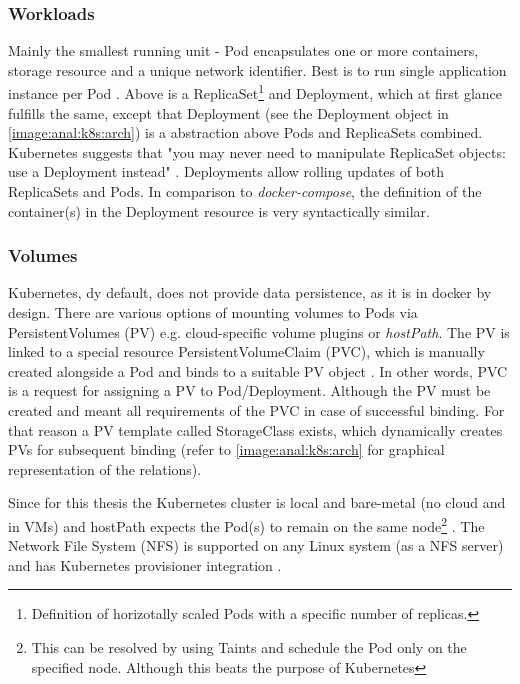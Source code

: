 \subsubsection*{Workloads \label{anal:k8s:resources:workloads}}
Mainly the smallest running unit - Pod encapsulates one or more containers, storage resource and a unique network identifier. Best is to run single application instance per Pod \cite{docs:k8s:concepts:pods}. Above is a ReplicaSet\footnote{Definition of horizotally scaled Pods with a specific number of replicas.} and Deployment, which at first glance fulfills the same, except that Deployment (see the Deployment object in \autoref{image:anal:k8s:arch}) is a abstraction above Pods and ReplicaSets combined. Kubernetes suggests that "you may never need to manipulate ReplicaSet objects: use a Deployment instead" \cite{docs:k8s:concepts:replicasets}. Deployments allow rolling updates of both ReplicaSets and Pods. In comparison to \textit{docker-compose}, the definition of the container(s) in the Deployment resource is very syntactically similar.

\subsubsection*{Volumes \label{anal:k8s:resources:volumes}}
Kubernetes, dy default, does not provide data persistence, as it is in docker by design. There are various options of mounting volumes to Pods via PersistentVolumes (PV) e.g. cloud-specific volume plugins or \textit{hostPath}. The PV is linked to a special resource PersistentVolumeClaim (PVC), which is manually created alongside a Pod and binds to a suitable PV object \cite{docs:k8s:concepts:persistentvolumes}. In other words, PVC is a request for assigning a PV to Pod/Deployment. Although the PV must be created and meant all requirements of the PVC in case of successful binding. For that reason a PV template called StorageClass exists, which dynamically creates PVs for subsequent binding (refer to \autoref{image:anal:k8s:arch} for graphical representation of the relations).

Since for this thesis the Kubernetes cluster is local and bare-metal (no cloud and in VMs) and hostPath expects the Pod(s) to remain on the same node\footnote{This can be resolved by using Taints and schedule the Pod only on the specified node. Although this beats the purpose of Kubernetes} \cite{docs:k8s:concepts:volumes}. The Network File System (NFS) is supported on any Linux system (as a NFS server) and has Kubernetes provisioner integration \cite{git:nfs}.


